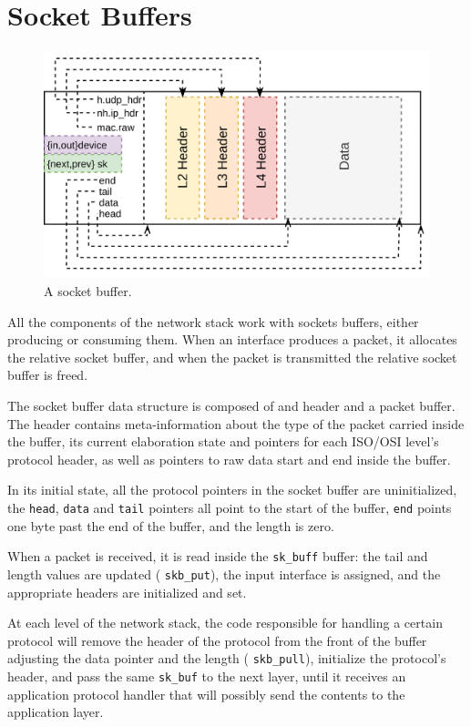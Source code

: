 \documentclass[a4paper,twoside,openright]{report}
\renewcommand{\t}[1]{%
	{\texttt{#1}}}
\begin{document}
\section{Socket Buffers}
\begin{figure}[H]
	\centering
	\includegraphics[width=0.7\linewidth]{assets/skbuf}
	\caption{A socket buffer.}
	\label{fig:skbuf}
\end{figure}

All the components of the network stack work with sockets buffers, either producing or consuming them. When an interface produces a packet, it allocates the relative socket buffer, and when the packet is transmitted the relative socket buffer is freed.

The socket buffer data structure is composed of and header and a packet buffer. The header contains meta-information about the type of the packet carried inside the buffer, its current elaboration state and pointers for each ISO/OSI level's protocol header, as well as pointers to raw data start and end inside the buffer.

In its initial state, all the protocol pointers in the socket buffer are uninitialized, the \texttt{head}, \texttt{data} and \texttt{tail} pointers all point to the start of the buffer, \texttt{end} points one byte past the end of the buffer, and the length is zero.

When a packet is received, it is read inside the \t{sk\_buff} buffer: the tail and length values are updated (\t{skb\_put}), the input interface is assigned, and the appropriate headers are initialized and set.

At each level of the network stack, the code responsible for handling a certain protocol will remove the header of the protocol from the front of the buffer adjusting the data pointer and the length (\t{skb\_pull}), initialize the protocol's header, and pass the same \t{sk\_buf} to the next layer, until it receives an application protocol handler that will possibly send the contents to the application layer.
\end{document}
